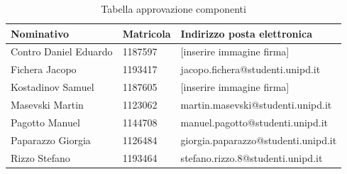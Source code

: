 \documentclass[../piano_di_progetto.tex]{subfiles}
\begin{document}
\begin{table}[!ht]
	\centering
	\begin{tabular}{|l|l|l|}
		\hline
		\rowcolor{lightgray}
		\textbf{Nominativo} & \textbf{Matricola} & \textbf{Indirizzo posta elettronica} \\ 
		\hline
		Contro Daniel Eduardo & 1187597 & [inserire immagine firma] \\ 
		\hline
		Fichera Jacopo & 1193417  & jacopo.fichera@studenti.unipd.it \\ 
		\hline
		Kostadinov Samuel & 1187605 & [inserire immagine firma] \\ 
		\hline
		Masevski Martin & 1123062 & martin.masevski@studenti.unipd.it \\ 
		\hline
		Pagotto Manuel & 1144708 & manuel.pagotto@studenti.unipd.it \\ 
		\hline
		Paparazzo Giorgia & 1126484 & giorgia.paparazzo@studenti.unipd.it \\ 
		\hline
		Rizzo Stefano & 1193464 & stefano.rizzo.8@studenti.unipd.it \\ 
		\hline
	\end{tabular}
		\caption{Tabella approvazione componenti}
\end{table}
\end{document}
